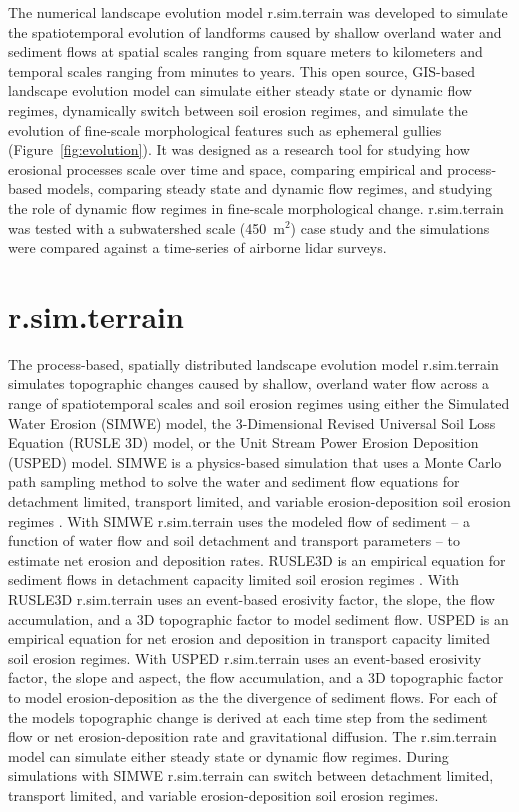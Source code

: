 \documentclass[gmd, manuscript]{copernicus}
\begin{document}
The numerical landscape evolution model 
r.sim.terrain was developed to 
simulate the spatiotemporal evolution of landforms
caused by shallow overland water and sediment flows
at spatial scales ranging from
square meters to kilometers
and temporal scales ranging from minutes to years. 
This open source, GIS-based landscape evolution model can
simulate either steady state or dynamic flow regimes, 
dynamically switch between soil erosion regimes, and
simulate the evolution of fine-scale morphological features 
such as ephemeral gullies
(Figure~\ref{fig:evolution}).
It was designed as a research tool for
studying how erosional processes scale over time and space,
comparing empirical and process-based models, 
comparing steady state and dynamic flow regimes, and
studying the role of dynamic flow regimes 
in fine-scale morphological change. 
r.sim.terrain was tested with 
a subwatershed scale (450~\unit{m}$^{2}$) case study
and the simulations were compared against 
a time-series of airborne lidar surveys.

\section{r.sim.terrain}
The process-based, spatially distributed 
landscape evolution model r.sim.terrain
simulates topographic changes
caused by shallow, overland water flow
across a range of spatiotemporal scales and soil erosion regimes
using either
the Simulated Water Erosion (SIMWE) model, 
the 3-Dimensional Revised Universal Soil Loss Equation (RUSLE 3D) model,
or the Unit Stream Power Erosion Deposition (USPED) model.  
SIMWE is a physics-based simulation
that uses a Monte Carlo path sampling method
to solve the water and sediment flow equations 
for detachment limited, transport limited, and variable erosion-deposition 
soil erosion regimes \citep{Mitasova2004}. 
With SIMWE 
r.sim.terrain
uses the modeled flow of sediment 
-- a function of water flow and soil detachment and transport parameters -- 
to estimate net erosion and deposition rates. 
RUSLE3D is an empirical equation for sediment flows 
in detachment capacity limited soil erosion regimes \citep{Mitasova1996}. 
With RUSLE3D
r.sim.terrain
uses an event-based erosivity factor, 
the slope, the flow accumulation, and a 3D topographic factor
to model sediment flow. 
USPED is an empirical equation for net erosion and deposition 
in transport capacity limited soil erosion regimes. 
With USPED 
r.sim.terrain
uses an event-based erosivity factor, 
the slope and aspect, the flow accumulation, and a 3D topographic factor
to model erosion-deposition as the
the divergence of sediment flows. 
For each of the models 
topographic change is derived at each time step
from the sediment flow or net erosion-deposition rate
and gravitational diffusion.
The r.sim.terrain model
can simulate either steady state or dynamic flow regimes.
During simulations with SIMWE 
r.sim.terrain
can switch between 
detachment limited, transport limited, and variable erosion-deposition 
soil erosion regimes.
\end{document}
